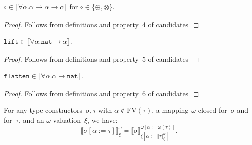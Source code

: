 \documentclass[a4paper,UKenglish,cleveref,autoref,numberwithinsect]{lipics-v2019}
\theoremstyle{definition}
\newcommand{\arrtype}{\rightarrow}
\newcommand{\subst}[2]{#1:=#2}
\newcommand{\nat}{\mathtt{nat}}
\newcommand{\flatten}{\mathtt{flatten}}
\newcommand{\lift}{\mathtt{lift}}
\newcommand{\FV}{\mathrm{FV}}
\newcommand{\val}[3]{\ensuremath{\llbracket#1\rrbracket_{#2}^{#3}}}
\begin{document}
\begin{lemma}\label{lem_circ}
  $\circ \in \val{\forall\alpha . \alpha \arrtype \alpha \arrtype
    \alpha}{}{}$ for $\circ \in \{ \oplus, \otimes \}$.
\end{lemma}

\begin{proof}
  Follows from definitions and property~4 of candidates.
\end{proof}

\begin{lemma}\label{lem_lift}
  $\lift \in \val{\forall\alpha.\nat\arrtype\alpha}{}{}$.
\end{lemma}

\begin{proof}
  Follows from definitions and property~5 of candidates.
\end{proof}

\begin{lemma}\label{lem_flatten}
  $\flatten \in \val{\forall\alpha.\alpha\arrtype\nat}{}{}$.
\end{lemma}

\begin{proof}
  Follows from definitions and property~6 of candidates.
\end{proof}

\begin{lemma}\label{lem_val_subst}
  For any type constructors~$\sigma,\tau$ with $\alpha \notin
  \FV(\tau)$, a mapping~$\omega$ closed for~$\sigma$ and for~$\tau$,
  and an $\omega$-valuation~$\xi$, we have:
  \[
  \val{\sigma[\subst{\alpha}{\tau}]}{\xi}{\omega} =
  \val{\sigma}{\xi[\subst{\alpha}{\val{\tau}{\xi}{\omega}}]}{\omega[\subst{\alpha}{\omega(\tau)}]}.
  \]
\end{lemma}
\end{document}
